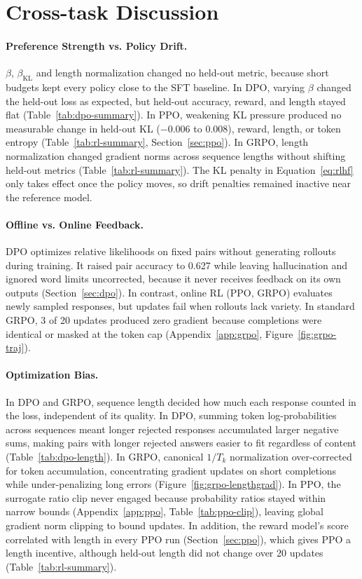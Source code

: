\documentclass{article}
\begin{document}
\section{Cross-task Discussion}
\label{sec:discussion}

\paragraph{Preference Strength vs. Policy Drift.} $\beta$, $\beta_{\text{KL}}$ and length normalization changed no held-out metric, because short budgets kept every policy close to the SFT baseline. In DPO, varying $\beta$ changed the held-out loss as expected, but held-out accuracy, reward, and length stayed flat (Table~\ref{tab:dpo-summary}). In PPO, weakening KL pressure produced no measurable change in held-out KL ($-0.006$ to $0.008$), reward, length, or token entropy (Table~\ref{tab:rl-summary}, Section~\ref{sec:ppo}). In GRPO, length normalization changed gradient norms across sequence lengths without shifting held-out metrics (Table~\ref{tab:rl-summary}). The KL penalty in Equation~\ref{eq:rlhf} only takes effect once the policy moves, so drift penalties remained inactive near the reference model.

\paragraph{Offline vs. Online Feedback.} DPO optimizes relative likelihoods on fixed pairs without generating rollouts during training. It raised pair accuracy to 0.627 while leaving hallucination and ignored word limits uncorrected, because it never receives feedback on its own outputs (Section~\ref{sec:dpo}). In contrast, online RL (PPO, GRPO) evaluates newly sampled responses, but updates fail when rollouts lack variety. In standard GRPO, 3 of 20 updates produced zero gradient because completions were identical or masked at the token cap (Appendix~\ref{app:grpo}, Figure~\ref{fig:grpo-traj}).

\paragraph{Optimization Bias.} In DPO and GRPO, sequence length decided how much each response counted in the loss, independent of its quality. In DPO, summing token log-probabilities across sequences meant longer rejected responses accumulated larger negative sums, making pairs with longer rejected answers easier to fit regardless of content (Table~\ref{tab:dpo-length}). In GRPO, canonical $1/T_k$ normalization over-corrected for token accumulation, concentrating gradient updates on short completions while under-penalizing long errors (Figure~\ref{fig:grpo-lengthgrad}). In PPO, the surrogate ratio clip never engaged because probability ratios stayed within narrow bounds (Appendix~\ref{app:ppo}, Table~\ref{tab:ppo-clip}), leaving global gradient norm clipping to bound updates. In addition, the reward model's score correlated with length in every PPO run (Section~\ref{sec:ppo}), which gives PPO a length incentive, although held-out length did not change over 20 updates (Table~\ref{tab:rl-summary}).
\end{document}
